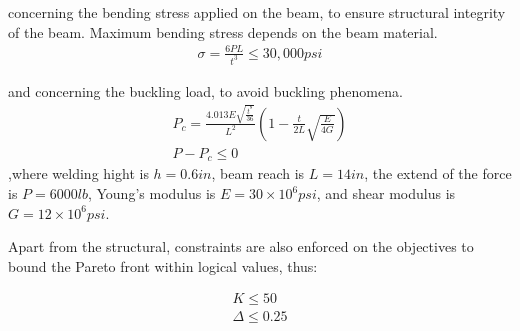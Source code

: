 concerning the bending stress applied on the beam, to ensure structural integrity of the beam. Maximum bending stress depends on the beam material.
\begin{eqnarray}
   \sigma = \frac{6PL}{t^3} \leq 30,000 psi
   \label{bend} 
\end{eqnarray}

and concerning the buckling load, to avoid buckling phenomena.  
\begin{eqnarray}
   P_c = \frac{4.013E\sqrt{\frac{t^8}{36}}}{L^2}\left( 1- \frac{t}{2L}\sqrt{\frac{E}{4G}} \right) \\
   \nonumber  P - P_c \leq 0 
   \label{back} 
\end{eqnarray}
,where welding hight is $h = 0.6 in$, beam reach is $L = 14 in$, the extend of the force is $P = 6000 lb$, Young’s modulus is $E = 30 \times 10^6 psi$, and shear modulus is $G = 12 \times 10^6 psi$.  

Apart from the structural, constraints are also enforced on the objectives to bound the Pareto front within logical values, thus:

\begin{eqnarray}
   K \leq 50 \\
   \Delta \leq 0.25 
   \label{obj} 
\end{eqnarray}


